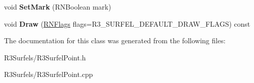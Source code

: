 \begin{DoxyCompactItemize}
\item 
void {\bfseries Set\+Mark} (R\+N\+Boolean mark)\hypertarget{class_r3_surfel_point_a7ffa68526868442273f240e262b6a245}{}\label{class_r3_surfel_point_a7ffa68526868442273f240e262b6a245}

\item 
void {\bfseries Draw} (\hyperlink{class_r_n_flags}{R\+N\+Flags} flags=R3\+\_\+\+S\+U\+R\+F\+E\+L\+\_\+\+D\+E\+F\+A\+U\+L\+T\+\_\+\+D\+R\+A\+W\+\_\+\+F\+L\+A\+GS) const \hypertarget{class_r3_surfel_point_aa3d83c5069b82f0ee71849083e4a491d}{}\label{class_r3_surfel_point_aa3d83c5069b82f0ee71849083e4a491d}

\end{DoxyCompactItemize}


The documentation for this class was generated from the following files\+:\begin{DoxyCompactItemize}
\item 
R3\+Surfels/R3\+Surfel\+Point.\+h\item 
R3\+Surfels/R3\+Surfel\+Point.\+cpp\end{DoxyCompactItemize}
